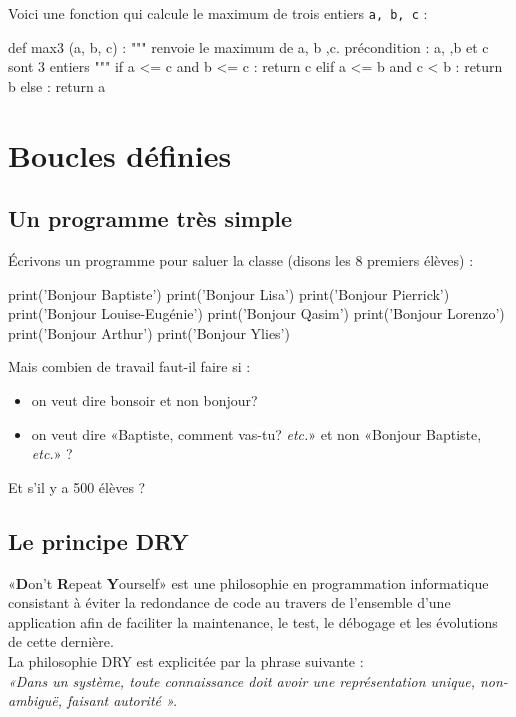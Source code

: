 Voici une fonction qui calcule le maximum de trois entiers \texttt{a, b, c} :
\begin{pyverbatim}
def max3 (a, b, c) :
    """ renvoie le maximum de a, b ,c.
    précondition : a, ,b et c sont 3 entiers """
    if a <= c and b <= c :
        return c
    elif a <= b and c < b :
        return b
    else :
        return a
\end{pyverbatim}



\section{Boucles définies}

\subsection{Un programme très simple}

Écrivons un programme pour saluer la classe (disons les 8 premiers
élèves) :
\begin{pyverbatim}
print('Bonjour Baptiste')
print('Bonjour Lisa')
print('Bonjour Pierrick')
print('Bonjour Louise-Eugénie')
print('Bonjour Qasim')
print('Bonjour Lorenzo')
print('Bonjour Arthur')
print('Bonjour Ylies')
\end{pyverbatim}

Mais combien de travail faut-il faire si :

\begin{itemize}
\item on veut dire bonsoir et non bonjour?
\item on veut dire «Baptiste, comment vas-tu? \textit{etc.}» et non
  «Bonjour Baptiste, \textit{etc.}» ?
\end{itemize}

Et s'il y a 500 élèves ?


\subsection{Le principe DRY}

«\textbf{D}on't \textbf{R}epeat \textbf{Y}ourself» est une philosophie en programmation 
informatique consistant à éviter la redondance de code au travers de l'ensemble d'une application 
afin de faciliter la maintenance, le test, le débogage et les évolutions de cette dernière.\\
La philosophie DRY est explicitée par la phrase suivante :\\
  \textit{«Dans un système, toute connaissance doit avoir une représentation
   unique, non-ambiguë, faisant autorité ».}

